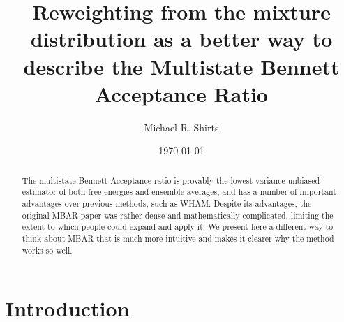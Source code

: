 \documentclass[aps,pre,twocolumn,superscriptaddress]{revtex4-1}
\begin{document}

\title{Reweighting from the mixture distribution as a better way to describe the Multistate Bennett Acceptance Ratio}

 \author{Michael R. Shirts}

\begin{abstract}The multistate Bennett Acceptance ratio is provably the
  lowest variance unbiased estimator of both free energies and
  ensemble averages, and has a number of important advantages over
  previous methods, such as WHAM. Despite its advantages, the original
  MBAR paper was rather dense and mathematically complicated, limiting
  the extent to which people could expand and apply it. We present
  here a different way to think about MBAR that is much more intuitive
  and makes it clearer why the method works so well.
\end{abstract}
\date{\today} 

\maketitle



\section{Introduction}
\end{document}
